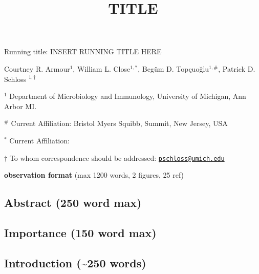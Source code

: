 \documentclass[
  11pt,
]{article}
\title{\textbf{TITLE}}
\author{}
\date{\vspace{-2.5em}}
\begin{document}
\maketitle

\vspace{20mm}

Running title: INSERT RUNNING TITLE HERE

\vspace{20mm}

Courtney R. Armour\({^1}\), William L. Close\(^{1,*}\), Begüm D.
Topçuoğlu\(^{1,\#}\), Patrick D. Schloss \(^{1,\dagger}\)

\vspace{5mm}

\({^1}\) Department of Microbiology and Immunology, University of
Michigan, Ann Arbor MI.

\({^\#}\) Current Affiliation: Bristol Myers Squibb, Summit, New Jersey,
USA~

\({^*}\) Current Affiliation:

\vspace{20mm}

\(\dagger\) To whom correspondence should be addressed:
\href{mailto:pschloss@umich.edu}{\nolinkurl{pschloss@umich.edu}}

\vspace{20mm}

\textbf{observation format} (max 1200 words, 2 figures, 25 ref)

\newpage

\linenumbers

\hypertarget{abstract-250-word-max}{%
\subsection{Abstract (250 word max)}\label{abstract-250-word-max}}

\hypertarget{importance-150-word-max}{%
\subsection{Importance (150 word max)}\label{importance-150-word-max}}

\newpage

\hypertarget{introduction-250-words}{%
\subsection{Introduction (\textasciitilde250
words)}\label{introduction-250-words}}
\end{document}
